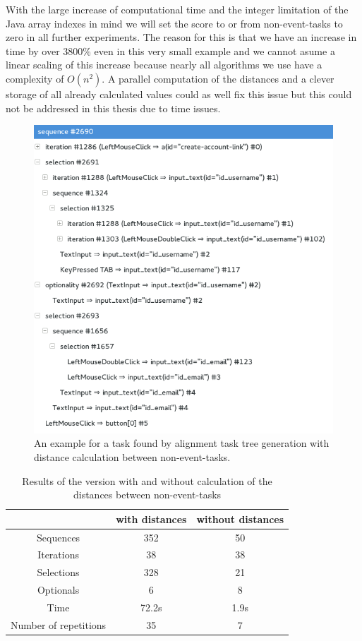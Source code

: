 With the large increase of computational time and the integer limitation of the Java array indexes in mind we will set the score to or from non-event-tasks to zero in all further experiments.
The reason for this is that we have an increase in time by over 3800\% even in this very small example and we cannot asume a linear scaling of this increase because nearly all algorithms we use have a complexity of $O(n^2)$.
A parallel computation of the distances and a clever storage of all already calculated values could as well fix this issue but this could not be addressed in this thesis due to time issues.

\begin{figure}[h]
	\centering
	\includegraphics[width=\textwidth]{chapters/casestudy/noneventcreateaccount.png}
	\caption{An example for a task found by alignment task tree generation with distance calculation between non-event-tasks.}
	\label{fig:noneventaccountcreation}
\end{figure}

\begin{table}[h]
	\centering
	\begin{tabular}{|c|c|c|}
		\hline
		& \textbf{with distances}& \textbf{without distances} \\
		\hline
		Sequences & 352 & 50 \\
		
		Iterations& 38  & 38 \\
		Selections& 328 & 21 \\
		Optionals & 6   & 8  \\
		\hline
		Time      &  72.2s & 1.9s \\
		Number of repetitions & 35 & 7\\
		\hline
	\end{tabular}
	\caption{Results of the version with and without calculation of the distances between non-event-tasks}
	\label{tab:resultsnoneventtasks}
\end{table}

